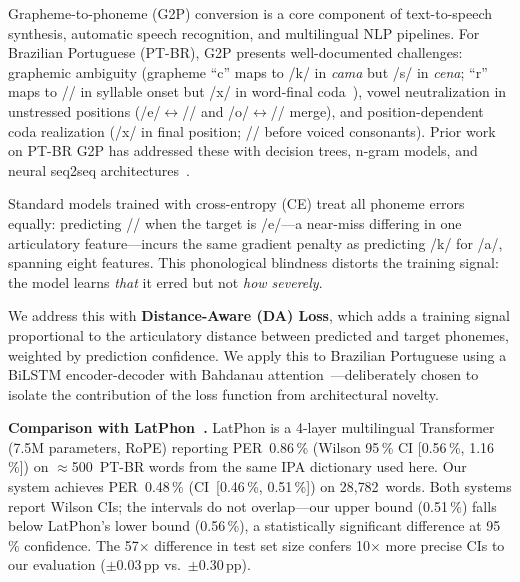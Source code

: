 \documentclass[conference]{IEEEtran}
\begin{document}
Grapheme-to-phoneme (G2P) conversion is a core component of
text-to-speech synthesis, automatic speech recognition, and
multilingual NLP pipelines.
For Brazilian Portuguese (PT-BR), G2P presents well-documented
challenges: graphemic ambiguity (grapheme ``c'' maps to /k/ in
\textit{cama} but /s/ in \textit{cena}; ``r'' maps to
// in syllable onset but /x/ in word-final
coda~\cite{barbosa2004brazilian}), vowel neutralization in
unstressed positions (/e/$\leftrightarrow$// and
/o/$\leftrightarrow$// merge), and position-dependent
coda realization (/x/ in final position; // before
voiced consonants).
Prior work on PT-BR G2P has addressed these with decision trees,
n-gram models, and neural seq2seq
architectures~\cite{neto2006brazilian}.

Standard models trained with cross-entropy (CE) treat all phoneme
errors equally: predicting // when the target is /e/---a
near-miss differing in one articulatory feature---incurs the same
gradient penalty as predicting /k/ for /a/, spanning eight features.
This phonological blindness distorts the training signal: the model
learns \emph{that} it erred but not \emph{how severely}.

We address this with \textbf{Distance-Aware (DA) Loss}, which adds a
training signal proportional to the articulatory distance between
predicted and target phonemes, weighted by prediction confidence.
We apply this to Brazilian Portuguese using a BiLSTM encoder-decoder
with Bahdanau attention~\cite{bahdanau2014neural}---deliberately
chosen to isolate the contribution of the loss function from
architectural novelty.

\textbf{Comparison with LatPhon~\cite{chary2025latphon}.}
LatPhon is a 4-layer multilingual Transformer (7.5M parameters, RoPE)
reporting PER~0.86\,\% (Wilson 95\,\% CI [0.56\,\%, 1.16\,\%]) on
$\approx$500~PT-BR words from the same IPA dictionary used here.
Our system achieves PER~0.48\,\% (CI~[0.46\,\%, 0.51\,\%]) on
28{,}782~words.
Both systems report Wilson CIs; the intervals do not overlap---our
upper bound (0.51\,\%) falls below LatPhon's lower bound
(0.56\,\%), a statistically significant difference at 95\,\%
confidence.
The 57$\times$ difference in test set size confers 10$\times$ more
precise CIs to our evaluation ($\pm$0.03\,pp vs.\
$\pm$0.30\,pp).
\end{document}
